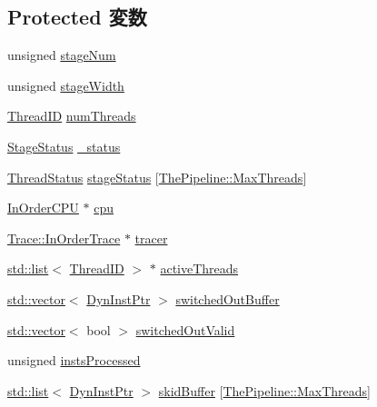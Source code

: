 \subsection*{Protected 変数}
\begin{DoxyCompactItemize}
\item 
unsigned \hyperlink{classPipelineStage_afc0a9a26d747553fd1fd8e698a8e7029}{stageNum}
\item 
unsigned \hyperlink{classPipelineStage_a51d98139f56a84585e4cb68e3cd67a1c}{stageWidth}
\item 
\hyperlink{base_2types_8hh_ab39b1a4f9dad884694c7a74ed69e6a6b}{ThreadID} \hyperlink{classPipelineStage_a88377f855dbf5adeeecb06b5bb821d35}{numThreads}
\item 
\hyperlink{classPipelineStage_add44b42ba3608b213fc0986c4aee6018}{StageStatus} \hyperlink{classPipelineStage_a4530a0391410036c939865008a53f356}{\_\-status}
\item 
\hyperlink{classPipelineStage_ae2739961013a00cede621d4d72f2173c}{ThreadStatus} \hyperlink{classPipelineStage_af95a0e3fe4e1c0a168cc3c74869a4816}{stageStatus} \mbox{[}\hyperlink{namespaceThePipeline_ac9c0bbe9cf27d93e08ea8ccc4096e633}{ThePipeline::MaxThreads}\mbox{]}
\item 
\hyperlink{classInOrderCPU}{InOrderCPU} $\ast$ \hyperlink{classPipelineStage_a41d682c28d0f49e04393c52815808782}{cpu}
\item 
\hyperlink{classTrace_1_1InOrderTrace}{Trace::InOrderTrace} $\ast$ \hyperlink{classPipelineStage_af3ad9be2b464186b902b5ca568b6d439}{tracer}
\item 
\hyperlink{classstd_1_1list}{std::list}$<$ \hyperlink{base_2types_8hh_ab39b1a4f9dad884694c7a74ed69e6a6b}{ThreadID} $>$ $\ast$ \hyperlink{classPipelineStage_af6eaea53db532812052f71bf0380dab5}{activeThreads}
\item 
\hyperlink{classstd_1_1vector}{std::vector}$<$ \hyperlink{classRefCountingPtr}{DynInstPtr} $>$ \hyperlink{classPipelineStage_a693e4a546dfc51b4e402fe75e73e812e}{switchedOutBuffer}
\item 
\hyperlink{classstd_1_1vector}{std::vector}$<$ bool $>$ \hyperlink{classPipelineStage_a09a91d6926260c8037374f0b646a62ee}{switchedOutValid}
\item 
unsigned \hyperlink{classPipelineStage_a4ac908fc89a76ee30c0af235353b6c2f}{instsProcessed}
\item 
\hyperlink{classstd_1_1list}{std::list}$<$ \hyperlink{classRefCountingPtr}{DynInstPtr} $>$ \hyperlink{classPipelineStage_ad02ffed1611064a60befad18c5d428ef}{skidBuffer} \mbox{[}\hyperlink{namespaceThePipeline_ac9c0bbe9cf27d93e08ea8ccc4096e633}{ThePipeline::MaxThreads}\mbox{]}

\end{DoxyCompactItemize}

